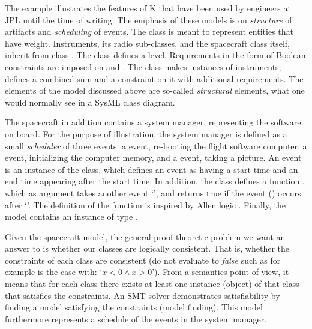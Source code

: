 The example illustrates the features of K
that have been used by engineers at JPL until the time of writing. The
emphasis of these models is on {\em structure} of artifacts and {\em
  scheduling} of events. The class  is meant to represent
entities that have weight. Instruments, its radio sub-classes, and 
the spacecraft class itself, inherit from 
class . The class  defines a 
level. Requirements in the form of Boolean constraints are imposed on
 and . The  class makes
instances of instruments, defines a combined sum
 and a constraint on it with additional
requirements. The elements of the model discussed above are so-called
{\em structural} elements, what one would normally see in a SysML
class diagram.

The spacecraft in addition contains a system manager, representing the
software on board. For the purpose of illustration, the system manager
is defined as a small {\em scheduler} of three events: a 
event, re-booting the flight software computer, a 
event, initializing the computer memory, and a 
event, taking a picture. An event is an instance of the 
class, which defines an event as having a start time and an end time
appearing after the start time. In addition, the  class
defines a function , which as argument takes another event
`', and returns true if the event () occurs after
`'.  The definition of the  function is inspired by 
Allen logic \cite{allen-logic-84}.
%
Finally, the model contains an instance  of type
.

Given the spacecraft model, the general proof-theoretic problem we
want an answer to is whether our classes are logically
consistent. That is, whether the constraints of each class are
consistent (do not evaluate to {\em false} such as for example is the
case with: `$x < 0 \wedge x > 0$'). From a semantics point of view, it
means that for each class there exists at least one instance (object)
of that class that satisfies the constraints.  An SMT solver demonstrates
satisfiability by finding a model satisfying the constraints
(model finding). This model furthermore represents a schedule of the events in
the system manager.


